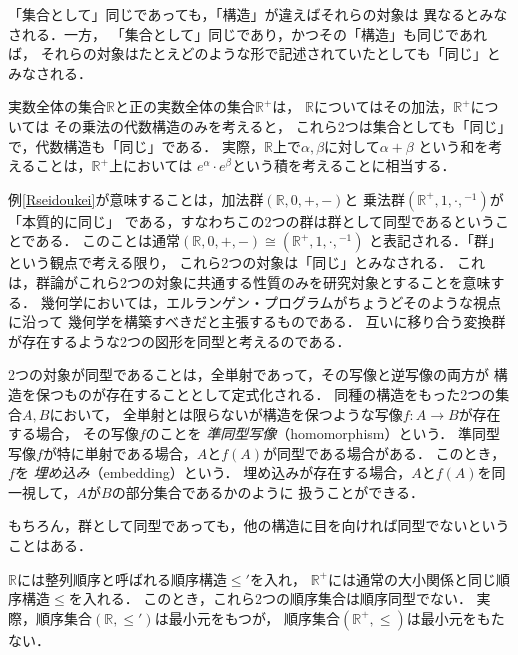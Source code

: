   「集合として」同じであっても，「構造」が違えばそれらの対象は
  異なるとみなされる．一方，
  「集合として」同じであり，かつその「構造」も同じであれば，
  それらの対象はたとえどのような形で記述されていたとしても「同じ」と
  みなされる．

  \begin{ex} \label{Rseidoukei}
    実数全体の集合$\mathbb{R}$と正の実数全体の集合$\mathbb{R}^+$は，
    $\mathbb{R}$についてはその加法，$\mathbb{R}^+$については
    その乗法の代数構造のみを考えると，
    これら2つは集合としても「同じ」で，代数構造も「同じ」である．
    実際，$\mathbb{R}$上で$\alpha , \beta$に対して$\alpha + \beta$
    という和を考えることは，$\mathbb{R}^+$上においては
    $e^{\alpha} \cdot e^{\beta}$という積を考えることに相当する．
  \end{ex}

  例\ref{Rseidoukei}が意味することは，加法群$( \mathbb{R} , 0, +,-)$と
  乗法群$( \mathbb{R}^+, 1, \cdot,{}^{-1}) $が「本質的に同じ」
  である，すなわちこの2つの群は群として同型であるということである．
  このことは通常$(\mathbb{R},0,+, -) \cong (\mathbb{R}^+ ,1,\cdot , {}^{-1})$
  と表記される．「群」という観点で考える限り，
  これら2つの対象は「同じ」とみなされる．
  これは，群論がこれら2つの対象に共通する性質のみを研究対象とすることを意味する．
  幾何学においては，エルランゲン・プログラムがちょうどそのような視点に沿って
  幾何学を構築すべきだと主張するものである．
  互いに移り合う変換群が存在するような2つの図形を同型と考えるのである．

  2つの対象が同型であることは，全単射であって，その写像と逆写像の両方が
  構造を保つものが存在することとして定式化される．
  同種の構造をもった2つの集合$A,B$において，
  全単射とは限らないが構造を保つような写像$f:A \longrightarrow B$が存在する場合，
  その写像$f$のことを
  \emph{準同型写像}（homomorphism）という．
  準同型写像$f$が特に単射である場合，$A$と$f(A)$が同型である場合がある．
  このとき，$f$を
  \emph{埋め込み}（embedding）という．
  埋め込みが存在する場合，$A$と$f(A)$を同一視して，$A$が$B$の部分集合であるかのように
  扱うことができる．

  もちろん，群として同型であっても，他の構造に目を向ければ同型でないということはある．

  \begin{ex} \label{ex:Rseinotdoukei}
    $\mathbb{R}$には整列順序と呼ばれる順序構造$\leq '$を入れ，
    $\mathbb{R}^+$には通常の大小関係と同じ順序構造$\leq$を入れる．
    このとき，これら2つの順序集合は順序同型でない．
    実際，順序集合$(\mathbb{R}, \leq ')$は最小元をもつが，
    順序集合$( \mathbb{R}^+ ,\leq) $は最小元をもたない．
  \end{ex}

